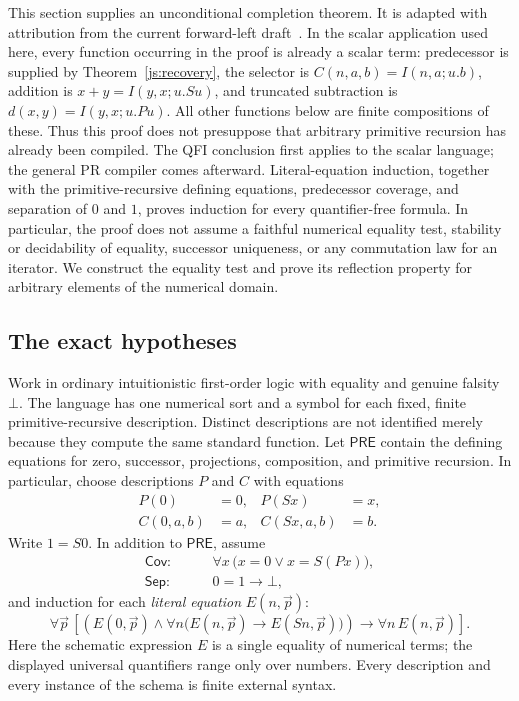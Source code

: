 \documentclass[11pt,letterpaper]{article}
\theoremstyle{definition}\newtheorem{definition}[theorem]{Definition}
\theoremstyle{remark}\newtheorem{remark}[theorem]{Remark}
\begin{document}
This section supplies an unconditional completion theorem. It is adapted
with attribution from the current forward-left draft~\cite{forward}. In the
scalar application used here, every function occurring in the proof is
already a scalar term: predecessor is supplied by
Theorem~\ref{js:recovery}, the selector is
$C(n,a,b)=I(n,a;u.b)$, addition is $x+y=I(y,x;u.Su)$, and
truncated subtraction is $d(x,y)=I(y,x;u.Pu)$. All other functions below
are finite compositions of these. Thus this proof does not presuppose
that arbitrary primitive recursion has already been compiled. The QFI
conclusion first applies to the scalar language; the general PR compiler
comes afterward.  Literal-equation
induction, together with the primitive-recursive defining equations,
predecessor coverage, and separation of $0$ and $1$, proves induction for every
quantifier-free formula.  In particular, the proof does not assume a faithful
numerical equality test, stability or decidability of equality, successor
uniqueness, or any commutation law for an iterator.  We construct the equality
test and prove its reflection property for arbitrary elements of the
numerical domain.

\subsection{The exact hypotheses}

Work in ordinary intuitionistic first-order logic with equality and genuine
falsity $\bot$.  The language has one numerical sort and a symbol for each
fixed, finite primitive-recursive description.  Distinct descriptions are
not identified merely because they compute the same standard function.
Let $\mathsf{PRE}$ contain the defining equations for zero, successor,
projections, composition, and primitive recursion.  In particular, choose
descriptions $P$ and $C$ with equations
\begin{align}
 P(0)&=0, & P(Sx)&=x, \label{eq:eic-predecessor}\\
 C(0,a,b)&=a, & C(Sx,a,b)&=b. \label{eq:eic-selector}
\end{align}
Write $1=S0$.  In addition to $\mathsf{PRE}$, assume
\begin{align}
 \mathsf{Cov}:&\qquad
       \forall x\,\bigl(x=0\lor x=S(Px)\bigr),
       \label{eq:eic-coverage}\\
 \mathsf{Sep}:&\qquad 0=1\longrightarrow\bot,
       \label{eq:eic-separation}
\end{align}
and induction for each \emph{literal equation} $E(n,\vec p)$:
\begin{equation}
 \forall\vec p\,
 \left[
   \left(E(0,\vec p)\land
       \forall n\bigl(E(n,\vec p)\longrightarrow E(Sn,\vec p)\bigr)
   \right)
   \longrightarrow\forall n\,E(n,\vec p)
 \right].
 \label{eq:eic-induction}
\end{equation}
Here the schematic expression $E$ is a single equality of numerical
terms; the displayed universal quantifiers range only over numbers.
Every description and every instance of the schema is finite external
syntax.
\end{document}
